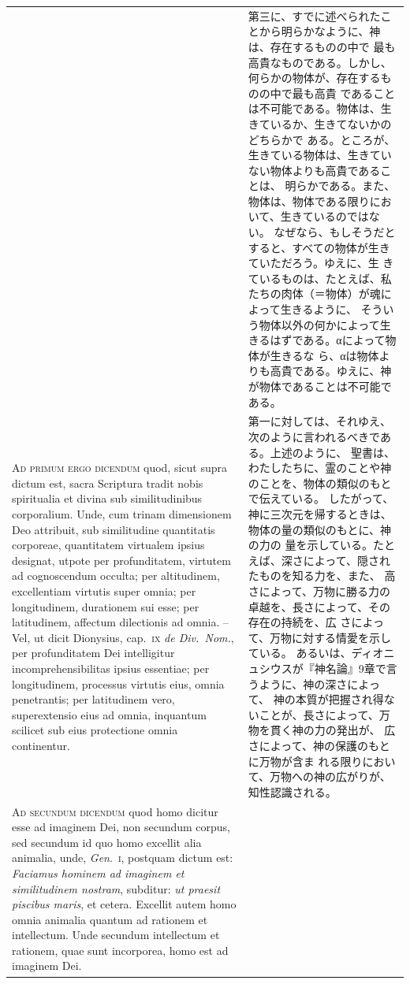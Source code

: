 \documentclass[paper=a4paper,fontsize=10pt,jafontsize=9pt,titlepage]{jlreq}
\begin{document}
\begin{longtable}{p{21em}p{21em}}
&

第三に、すでに述べられたことから明らかなように、神は、存在するものの中で
最も高貴なものである。しかし、何らかの物体が、存在するものの中で最も高貴
であることは不可能である。物体は、生きているか、生きてないかのどちらかで
ある。ところが、生きている物体は、生きていない物体よりも高貴であることは、
明らかである。また、物体は、物体である限りにおいて、生きているのではない。
なぜなら、もしそうだとすると、すべての物体が生きていただろう。ゆえに、生
きているものは、たとえば、私たちの肉体（＝物体）が魂によって生きるように、
そういう物体以外の何かによって生きるはずである。αによって物体が生きるな
ら、αは物体よりも高貴である。ゆえに、神が物体であることは不可能である。

\\

{\scshape Ad primum ergo dicendum} quod, sicut supra dictum est, sacra
 Scriptura tradit nobis spiritualia et divina sub similitudinibus
 corporalium. Unde, cum trinam dimensionem Deo attribuit, sub
 similitudine quantitatis corporeae, quantitatem virtualem ipsius
 designat, utpote per profunditatem, virtutem ad cognoscendum occulta;
 per altitudinem, excellentiam virtutis super omnia; per longitudinem,
 durationem sui esse; per latitudinem, affectum dilectionis ad omnia. --
 Vel, ut dicit Dionysius, cap.~{\scshape ix} {\itshape de Div.~Nom.}, per
 profunditatem Dei intelligitur incomprehensibilitas ipsius essentiae;
 per longitudinem, processus virtutis eius, omnia penetrantis; per
 latitudinem vero, superextensio eius ad omnia, inquantum scilicet sub
 eius protectione omnia continentur.

&

 第一に対しては、それゆえ、次のように言われるべきである。上述のように、
聖書は、わたしたちに、霊のことや神のことを、物体の類似のもとで伝えている。
 したがって、神に三次元を帰するときは、物体の量の類似のもとに、神の力の
 量を示している。たとえば、深さによって、隠されたものを知る力を、また、
 高さによって、万物に勝る力の卓越を、長さによって、その存在の持続を、広
 さによって、万物に対する情愛を示している。
あるいは、ディオニュシウスが『神名論』9章で言うように、神の深さによって、
 神の本質が把握され得ないことが、長さによって、万物を貫く神の力の発出が、
 広さによって、神の保護のもとに万物が含ま
 れる限りにおいて、万物への神の広がりが、知性認識される。

\\



{\scshape Ad secundum dicendum} quod homo dicitur esse ad imaginem Dei, non
 secundum corpus, sed secundum id quo homo excellit alia animalia, unde,
{\itshape Gen}.~{\scshape i}, postquam dictum est: {\itshape Faciamus hominem ad imaginem et
 similitudinem nostram}, subditur: {\itshape ut praesit piscibus maris}, et
 cetera. Excellit autem homo omnia animalia quantum ad rationem et
 intellectum. Unde secundum intellectum et rationem, quae sunt
 incorporea, homo est ad imaginem Dei.



\end{longtable}
\end{document}

